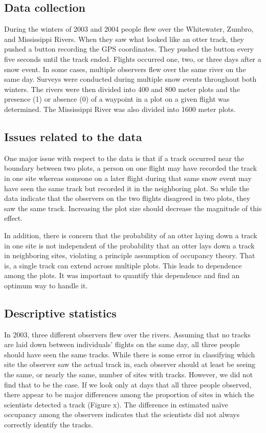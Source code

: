 \documentclass[12pt]{article}
\begin{document}
    \subsection{Data collection}
    During the winters of 2003 and 2004 people flew over the Whitewater, Zumbro,
    and Mississippi Rivers. When they saw what looked like an otter track, they
    pushed a button recording the GPS coordinates. They pushed the button every
    five seconds until the track ended. Flights occurred one, two, or three days
    after a snow event. In some cases, multiple observers flew over the same
    river on the same day. Surveys were conducted during multiple snow events
    throughout both winters. The rivers were then divided into 400 and 800 meter
    plots and the presence (1) or absence (0) of a waypoint in a plot on a given
    flight was determined. The Mississippi River was also divided into 1600
    meter plots.

    \subsection{Issues related to the data}
    One major issue with respect to the data is that if a track occurred near
    the boundary between two plots, a person on one flight may have recorded the
    track in one site whereas someone on a later flight during that same snow
    event may have seen the same track but recorded it in the neighboring plot.
    So while the data indicate that the observers on the two flights disagreed
    in two plots, they saw the same track. Increasing the plot size should
    decrease the magnitude of this effect.

    In addition, there is concern that the probability of an otter laying down a
    track in one site is not independent of the probability that an otter lays
    down a track in neighboring sites, violating a principle assumption of
    occupancy theory. That is, a single track can extend across multiple plots.
    This leads to dependence among the plots. It was important to quantify this
    dependence and find an optimum way to handle it.

    \subsection{Descriptive statistics}
    In 2003, three different observers flew over the rivers. Assuming that no
    tracks are laid down between individuals' flights on the same day, all three
    people should have seen the same tracks. While there is some error in
    classifying which site the observer saw the actual track in, each observer
    should at least be seeing the same, or nearly the same, number of sites with
    tracks. However, we did not find that to be the case. If we look only at
    days that all three people observed, there appear to be major differences
    among the proportion of sites in which the scientists detected a track
    (Figure x). The difference in estimated na\"ive occupancy among the
    observers indicates that the scientists did not always correctly identify
    the tracks.
\end{document}
